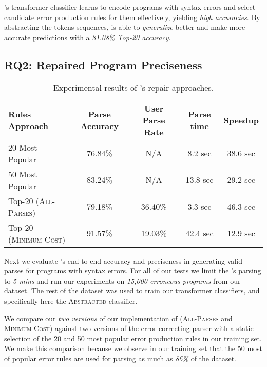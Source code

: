 \begin{framed}
  \noindent \toolname's transformer classifier learns to encode programs with
  syntax errors and select candidate error production rules for them
  effectively, yielding \emph{high accuracies}. By abstracting the tokens
  sequences, \toolname is able to \emph{generalize} better and make more
  accurate predictions with a \emph{81.08\% Top-20 accuracy}.
\end{framed}


\subsection{RQ2: Repaired Program Preciseness}
\label{sec:eval:precise}

\begin{table}[t]
  \centering
  \begin{tabular}{l||cccc}
    Rules Approach                 & Parse Accuracy & User Parse Rate & Parse time & Speedup \\
    \hline
    20 Most Popular                & 76.84\% & N/A     & 8.2 sec  & 38.6 sec \\
    50 Most Popular                & 83.24\% & N/A     & 13.8 sec & 29.2 sec \\
    Top-20 (\textsc{All-Parses})   & 79.18\% & 36.40\% & 3.3 sec  & 46.3 sec \\
    Top-20 (\textsc{Minimum-Cost}) & 91.57\% & 19.03\% & 42.4 sec & 12.9 sec \\
  \end{tabular}
  \caption{Experimental results of \toolname's repair approaches.}
  \label{tab:seq2parse_full_results}
\end{table}

Next we evaluate \toolname's end-to-end accuracy and preciseness in generating
valid parses for programs with syntax errors. For all of our tests we limit the
\toolname's parsing to \emph{5 mins} and run our experiments on \emph{15,000
erroneous programs} from our dataset. The rest of the dataset was used to train
our transformer classifiers, and specifically here the \textsc{Abstracted}
classifier.

We compare our \emph{two versions} of our implementation of \toolname
(\textsc{All-Parses} and \textsc{Minimum-Cost}) against two versions of the
error-correcting parser with a static selection of the 20 and 50 most popular
error production rules in our training set. We make this comparison because we
observe in our training set that the 50 most of popular error rules are used for
parsing as much as \emph{86\%} of the dataset.


